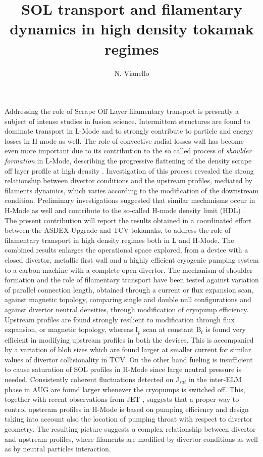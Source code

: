 \documentclass{epsconf}
\title{SOL transport and filamentary dynamics in high density tokamak regimes}
\author{N. Vianello}
\institute{Consorzio RFX, C.so Stati Uniti 4, 35127, Padova, Italy}
\begin{document}
\maketitle
Addressing the role of Scrape Off Layer filamentary transport is
presently a subject of intense studies in fusion science. 
Intermittent structures are found to dominate transport in
L-Mode and to strongly contribute to particle
and energy losses in H-mode as well.
The role of convective radial losses wall has become even more important due to its 
contribution 
to the so called process of \emph{shoulder formation} in
L-Mode, describing the progressive flattening of the density
scrape off layer profile at high density
\cite{LaBombard:2001ks,Carralero:2015gu,Militello:2016hk,Vianello:2017ku}.
Investigation of this process revealed the strong
relationship between divertor conditions and the upstream profiles,
mediated by filaments dynamics,  which varies
according to the modification of the downstream condition.
Preliminary investigations suggested that similar mechanisms
occur in H-Mode as well \cite{Carralero:2017gb} and contribute to
the so-called H-mode density limit (HDL) \cite{bernert2014h}.  
The present contribution will report the results obtained in a
coordinated effort between the ASDEX-Upgrade and TCV tokamaks, to address
the role of filamentary transport in high density regimes both in L
and H-Mode. The combined  results enlarges the operational
space explored, from a device with a closed divertor, metallic
first wall and a highly efficient cryogenic pumping system to a carbon
machine with a complete open divertor.
The mechanism of shoulder formation and the role of filamentary
transport have been tested against variation of parallel connection
length, obtained through a current or flux expansion scan,
against magnetic topology, comparing single and double null configurations
and against divertor neutral densities, through modification of
cryopump efficiency. Upstream profiles are found strongly resilient to
modification through flux expansion, or magnetic topology,
whereas I$_p$ scan at constant B$_t$ is found very efficient in
modifying  upstream profiles in both the devices. This is
accompanied by a variation of blob sizes which are found larger at
smaller current for similar values of divertor collisionality in TCV.
On the other hand
fueling is insufficient to cause saturation of SOL
profiles in H-Mode since large neutral pressure is
needed. Consistently coherent fluctuations detected on J$_{sat}$ in
the inter-ELM phase in AUG are
found larger whenever the cryopumps is switched off.
This, together with recent observations from JET
\cite{wynn},
suggests that a proper way to control upstream profiles in
H-Mode is based on pumping efficiency and design taking into account
also the location of pumping throat with respect to divertor
geometry. 
The resulting picture suggests a complex
relationship between divertor and upstream profiles, where filaments
are modified by divertor conditions as well as by neutral particles
interaction.

\begin{multicols}{2}%
\begingroup
{}
\printbibliography[heading=none]
\endgroup
\end{multicols}
\end{document}
